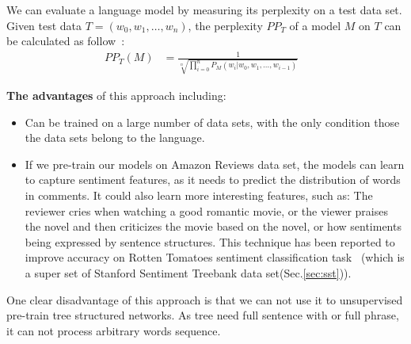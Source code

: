 We can evaluate a language model by measuring its perplexity on a test data set. Given test data \(T = (w_0, w_1,\ldots,w_n)\), the perplexity \(PP_T\) of a model \(M\) on \(T\) can be calculated as follow~\cite{perplexity}:
\begin{align}
    PP_T(M) &= \frac{1}{\sqrt[n]{\prod_{i=0}^{n} P_M(w_{i}|w_0, w_1,\ldots,w_{i-1})}}&
\end{align}

\label{lm-hypothesis}
\textbf{The advantages} of this approach including:
\begin{itemize}
\item Can be trained on a large number of data sets, with the only condition those the data sets belong to the language.
\label{unproved:unsupervised-good}
\item If we pre-train our models on Amazon Reviews data set, the models can learn to capture sentiment features, as it needs to predict the distribution of words in comments.
It could also learn more interesting features, such as: 
The reviewer cries when watching a good romantic movie, or the viewer praises the novel and then criticizes the movie based on the novel, or how sentiments being expressed by sentence structures. 
This technique has been reported to improve accuracy on Rotten Tomatoes sentiment classification task~\cite{Rotten-Tomato} (which is a super set of Stanford Sentiment Treebank data set(Sec.\ref{sec:sst})).
\end{itemize}

One clear disadvantage of this approach is that we can not use it to unsupervised pre-train tree structured networks. 
As tree need full sentence with or full phrase, it can not process arbitrary words sequence. 

